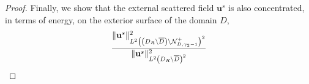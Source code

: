 \documentclass[11pt,reqno,twoside]{amsart}
\theoremstyle{definition}
\theoremstyle{remark}
\numberwithin{equation}{section}
\newcommand{\bu}{\mathbf{u}}
\begin{document}
\begin{proof}
	Finally, we show that the external scattered field $\bu^s$ is also concentrated, in terms of energy, on the exterior surface of the domain $D$,
	\begin{align}
		&\frac{\|\mathbf{u}^s\|_{L^2\left(\left(D_R \setminus \overline{D}\right) \setminus \mathcal{N}_{D,\gamma_{2}-1}^{+}\right)^2}^2}{\|\mathbf{u}^s\|_{L^2\left(D_{R}\setminus \overline{D}\right)^2}^2}\notag\\

\end{align}
\end{proof}
\end{document}
